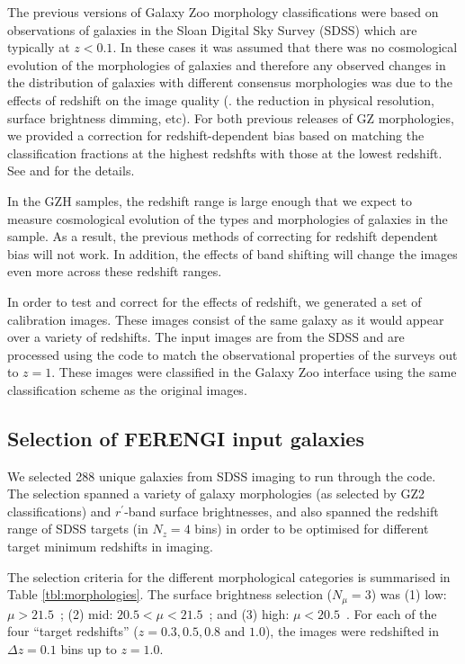\documentclass[usenatbib]{mn2e}
\begin{document}
The previous versions of Galaxy Zoo morphology classifications \citep{lin08,wil13} were based on observations of galaxies in the Sloan Digital Sky Survey (SDSS) which are typically at $z<0.1$. In these cases it was assumed that there was no cosmological evolution of the morphologies of galaxies and therefore any observed changes in the distribution of galaxies with different consensus morphologies was due to the effects of redshift on the image quality (\ie. the reduction in physical resolution, surface brightness dimming, etc). For both previous releases of GZ morphologies, we provided a correction for redshift-dependent bias based on matching the classification fractions at the highest redshfts with those at the lowest redshift. See \citet{bam09} and \citet{wil13} for the details. 

In the GZH samples, the redshift range is large enough that we expect to measure cosmological evolution of the types and morphologies of galaxies in the sample. As a result, the previous methods of correcting for redshift dependent bias will not work. In addition, the effects of band shifting will change the images even more across these redshift ranges. %

In order to test and correct for the effects of redshift, we generated a set of calibration images. These images consist of the same galaxy as it would appear over a variety of redshifts. The input images are from the SDSS \citep{yor00,str02} and are processed using the \ferengi{} code \citep{bar08a} to match the observational properties of the \hst{} surveys out to $z=1$. These images were classified in the Galaxy Zoo interface using the same classification scheme as the original \hst{} images.
 
\subsection{Selection of FERENGI input galaxies}

We selected 288 unique galaxies from SDSS imaging to run through the \ferengi{} code. The selection spanned a variety of galaxy morphologies (as selected by GZ2 classifications) and $r^\prime$-band surface brightnesses, and also spanned the redshift range of SDSS targets (in $N_z = 4$ bins) in order to be optimised for different target minimum redshifts in \hst{} imaging. 

The selection criteria for the different morphological categories is summarised in Table \ref{tbl:morphologies}. The surface brightness selection ($N_\mu = 3$) was (1) low: $\mu > 21.5$~\magarc;  (2) mid: $20.5 < \mu < 21.5$~\magarc; and (3) high: $\mu < 20.5$~\magarc. For each of the four ``target redshifts'' ($z = 0.3, 0.5, 0.8$ and $1.0$), the images were redshifted in $\Delta z = 0.1$ bins up to $z=1.0$. 
 
\end{document}
